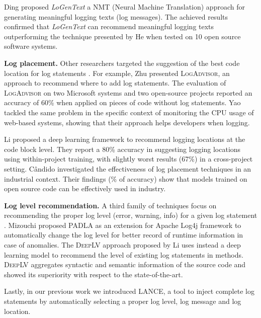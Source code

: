 Ding \etal proposed \textit{LoGenText} \cite{ding2022logentext} a NMT (Neural Machine Translation) approach for generating meaningful logging texts (\ie log messages). The achieved results confirmed that  \textit{LoGenText} can recommend meaningful logging texts outperforming the technique presented by He \etal \cite{he2018characterizing} when tested on 10 open source \java software systems.

 \smallskip 

\textbf{Log placement.} Other researchers targeted the suggestion of the best code location for log statements \cite{jia2018smartlog,li2018studying,li2020towards}. For example, Zhu \etal \cite{zhu2015learning} presented \textsc{LogAdvisor}, an approach to recommend where to add log statements. The evaluation of \textsc{LogAdvisor} on two Microsoft systems and two open-source projects reported an accuracy of 60\% when applied on pieces of code without log statements.
Yao \etal \cite{yao2018log4perf} tackled the same problem in the specific context of monitoring the CPU usage of web-based systems, showing that their approach helps developers when logging.

Li \etal \cite{li2020shall} proposed a deep learning framework to recommend logging locations at the code block level. They report a 80\% accuracy in suggesting logging locations using within-project training, with slightly worst results (67\%) in a cross-project setting. C\^andido \etal \cite{candido2021exploratory} investigated the effectiveness of log placement techniques in an industrial context. Their findings (\% of accuracy) show that models trained on open source code can be effectively used in industry. \smallskip 

\textbf{Log level recommendation.} A third family of techniques focus on recommending the proper log level (\eg error, warning, info) for a given log statement \cite{yuan2012characterizing,oliner2012advances}. Mizouchi \etal \cite{mizouchi2019padla} proposed \textsc{PADLA} as an extension for Apache Log4j framework to automatically change the log level for better record of runtime information in case of anomalies. 
The \textsc{DeepLV} approach proposed by Li \etal \cite{li2021deeplv} uses instead a deep learning model to recommend the level of existing log statements in methods. \textsc{DeepLV} aggregates syntactic and semantic information of the source code and showed its superiority with respect to the state-of-the-art. 

Lastly, in our previous work \cite{mastropaolo2022using} we introduced \textsc{LANCE}, a tool to inject complete log statements by automatically selecting a proper log level, log message and log location. 

